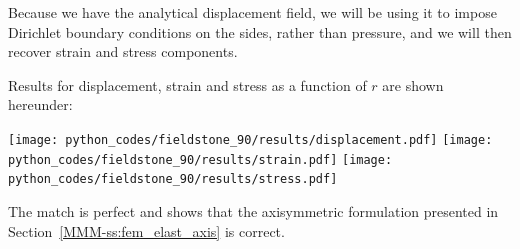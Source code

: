 \begin{center}
\end{center}

Because we have the analytical displacement field, we will be using it to 
impose Dirichlet boundary conditions on the sides, rather than pressure, and 
we will then recover strain and stress components.

Results for displacement, strain and stress as a function of $r$ are shown hereunder:
\begin{center}
\texttt{[image: python\_codes/fieldstone\_90/results/displacement.pdf]}
\texttt{[image: python\_codes/fieldstone\_90/results/strain.pdf]}
\texttt{[image: python\_codes/fieldstone\_90/results/stress.pdf]}
\end{center}
The match is perfect and shows that the axisymmetric formulation presented in 
Section~\ref{MMM-ss:fem_elast_axis} is correct.

